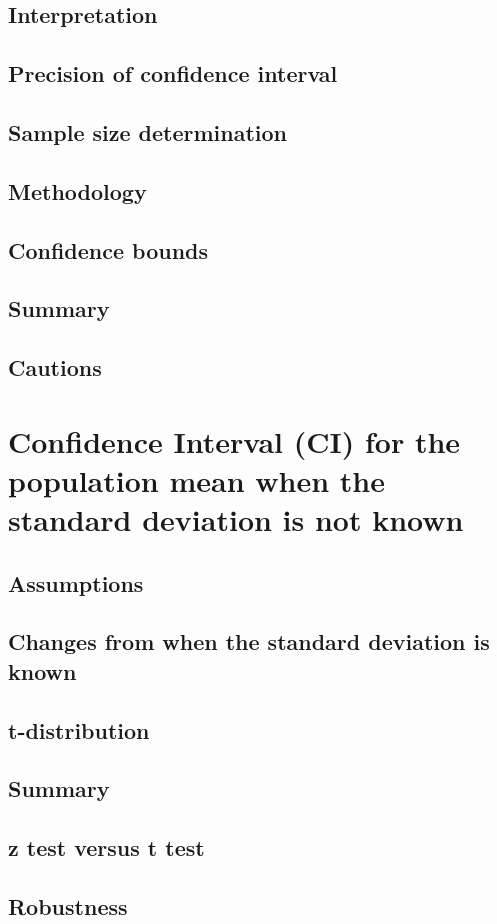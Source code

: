     \subsection{Interpretation}  %
    \subsection{Precision of confidence interval}  %
    \subsection{Sample size determination}  %
    \subsection{Methodology}  %
    \subsection{Confidence bounds}  %
    \subsection{Summary}  %
    \subsection{Cautions}  %

\section{Confidence Interval (CI) for the population mean when the standard deviation is not known}  %
    \subsection{Assumptions}  %
    \subsection{Changes from when the standard deviation is known}  %
    \subsection{t-distribution}  %
    \subsection{Summary}  %
    \subsection{z test versus t test}  %
    \subsection{Robustness}  %
